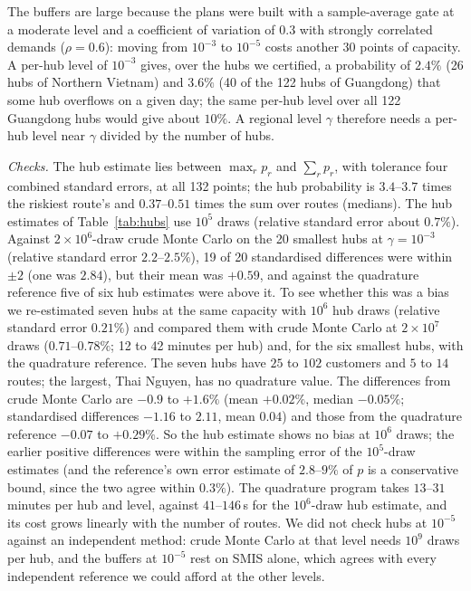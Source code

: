 \documentclass[11pt]{article}
\theoremstyle{definition}
\theoremstyle{remark}
\begin{document}
The buffers are large because the plans were built with a sample-average
gate at a moderate level and a coefficient of variation of $0.3$ with
strongly correlated demands ($\rho=0.6$): moving from $10^{-3}$ to $10^{-5}$
costs another $30$ points of capacity. A per-hub level of $10^{-3}$ gives, over the hubs we certified,
a probability of $2.4\%$ (26 hubs of Northern Vietnam) and $3.6\%$ (40 of the
122 hubs of Guangdong) that some hub overflows on a given day; the same
per-hub level over all 122 Guangdong hubs would give about $10\%$. A regional
level $\gamma$ therefore needs a per-hub level near $\gamma$ divided by the
number of hubs.

\emph{Checks.} The hub estimate lies between $\max_r p_r$ and $\sum_r p_r$,
with tolerance four combined standard errors, at all 132 points; the hub
probability is $3.4$--$3.7$ times the riskiest route's and $0.37$--$0.51$
times the sum over routes (medians). The hub estimates of Table~\ref{tab:hubs}
use $10^5$ draws (relative standard error about $0.7\%$). Against
$2\times10^6$-draw crude Monte Carlo on the 20 smallest hubs at
$\gamma=10^{-3}$ (relative standard error $2.2$--$2.5\%$), 19 of 20
standardised differences were within $\pm2$ (one was $2.84$), but their mean
was $+0.59$, and against the quadrature reference five of six hub estimates
were above it. To see whether this was a bias we re-estimated seven hubs at
the same capacity with $10^6$ hub draws (relative standard error $0.21\%$) and
compared them with crude Monte Carlo at $2\times10^7$ draws
($0.71$--$0.78\%$; 12 to 42 minutes per hub) and, for the six smallest hubs,
with the quadrature reference. The seven hubs have $25$ to $102$ customers and
$5$ to $14$ routes; the largest, Thai Nguyen, has no quadrature value. The
differences from crude Monte Carlo are $-0.9$ to $+1.6\%$ (mean $+0.02\%$,
median $-0.05\%$; standardised differences $-1.16$ to $2.11$, mean $0.04$) and
those from the quadrature reference $-0.07$ to $+0.29\%$. So the hub estimate
shows no bias at $10^6$ draws; the earlier positive differences were within the
sampling error of the $10^5$-draw estimates (and the reference's own error
estimate of $2.8$--$9\%$ of $p$ is a conservative bound, since the two
agree within $0.3\%$). The quadrature program takes $13$--$31$ minutes per hub
and level, against $41$--$146$\,s for the $10^6$-draw hub estimate, and its
cost grows linearly with the number of routes. We did not check hubs at
$10^{-5}$ against an independent method: crude Monte Carlo at that level needs
$10^9$ draws per hub, and the buffers at $10^{-5}$ rest on SMIS alone, which
agrees with every independent reference we could afford at the other levels.
\end{document}
